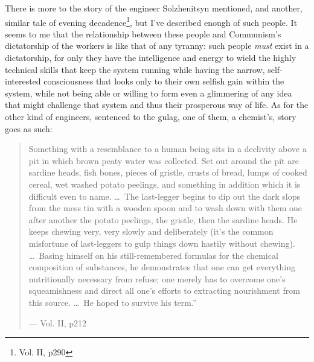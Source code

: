 \documentclass{article}
\begin{document}
%

There is more to the story of the engineer Solzhenitsyn mentioned, and another, similar tale of evening decadence\footnote{Vol. II, p290}, but I've described enough of such people.  It seems to me that the relationship between these people and Communism's dictatorship of the workers is like that of any tyranny: such people \emph{must} exist in a dictatorship, for only they have the intelligence and energy to wield the highly technical skills that keep the system running while having the narrow, self-interested consciousness that looks only to their own selfish gain within the system, while not being able or willing to form even a glimmering of any idea that might challenge that system and thus their prosperous way of life.  As for the other kind of engineers, sentenced to the gulag, one of them, a chemist's, story goes as such:

\begin{quote}
Something with a resemblance to a human being sits in a declivity above a pit in which brown peaty water was collected.  Set out around the pit are sardine heads, fish bones, pieces of gristle, crusts of bread, lumps of cooked cereal, wet washed potato peelings, and something in addition which it is difficult even to name. \ldots~The last-legger begins to dip out the dark slops from the mess tin with a wooden spoon and to wash down with them one after another the potato peelings, the gristle, then the sardine heads.  He keeps chewing very, very slowly and deliberately (it's the common misfortune of last-leggers to gulp things down hastily without chewing). \ldots~Basing himself on his still-remembered formulas for the chemical composition of substances, he demonstrates that one can get everything nutritionally necessary from refuse; one merely has to overcome one's squeamishness and direct all one's efforts to extracting nourishment from this source. \ldots~He hoped to survive his term.''

--- Vol. II, p212
\end{quote}
\end{document}
